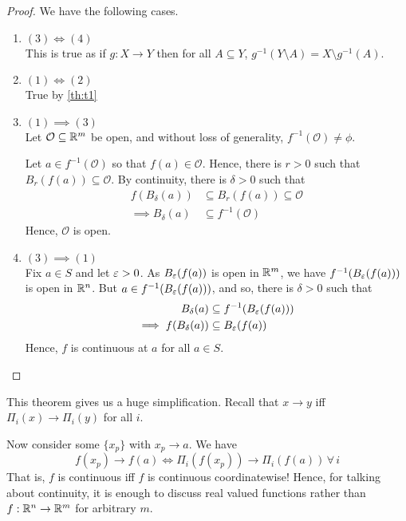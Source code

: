 \documentclass[../Analysis-3.tex]{subfiles}
\begin{document}
\begin{proof} We have the following cases.
  \begin{enumerate}[label = $\bullet$]
    \item $ (3) \iff (4) $\\
          This is true as if $ g: X \to Y $ then for all $ A \subseteq Y $, $ g^{-1}(Y \setminus A) = X \setminus g^{-1}(A) $.
    \item $ (1) \iff (2) $\\
          True by \ref{th:t1}

    \item $ (1) \implies (3) $\\
          Let $ \mathcal O \subseteq \mathbb{R}^m $ be open, and without loss of generality, $ f^{-1}(\mathcal O) \neq \phi $.

          Let $ a \in f^{-1}(\mathcal{O}) $ so that $ f(a) \in \mathcal O $. Hence, there is $ r > 0 $ such that $ B_r(f(a)) \subseteq \mathcal O $. By continuity, there is $ \delta > 0 $ such that
          \begin{align*}
            f(B_\delta(a))       & \subseteq B_r(f(a)) \subseteq \mathcal O \\
            \implies B_\delta(a) & \subseteq f^{-1}(\mathcal{O})
          \end{align*}
          Hence, $ \mathcal O $ is open.

    \item $ (3) \implies (1) $\\
          Fix $ a \in S $ and let $ \varepsilon > 0 $. As $ B_\varepsilon(f(a)) $ is open in $ \mathbb{R}^m $, we have $ f^{-1}(B_\varepsilon(f(a))) $ is open in $ \mathbb{R}^n $. But $ a \in f^{-1}(B_\varepsilon(f(a))) $, and so, there is $ \delta > 0 $ such that
          \begin{align*}
            B_\delta(a)             & \subseteq f^{-1}(B_\varepsilon(f(a))) \\
            \implies f(B_\delta(a)) & \subseteq B_\varepsilon(f(a))
          \end{align*}
          Hence, $ f $ is continuous at $ a $ for all $ a \in S $.
  \end{enumerate}
\end{proof}

This theorem gives us a huge simplification. Recall that $ x \longrightarrow y $ iff $ \Pi_i(x) \longrightarrow \Pi_i(y) $ for all $ i $.

Now consider some $ \{x_p\} $ with $ x_p \longrightarrow a $. We have
\[ f(x_p) \longrightarrow f(a) \iff \Pi_i(f(x_p)) \longrightarrow \Pi_i(f(a)) \, \forall \, i  \]
That is, $ f $ is continuous iff $ f $ is continuous coordinatewise! Hence, for talking about continuity, it is enough to discuss real valued functions rather than $ f: \mathbb{R}^n \to \mathbb{R}^m $ for arbitrary $ m $.
\pagebreak
\end{document}

